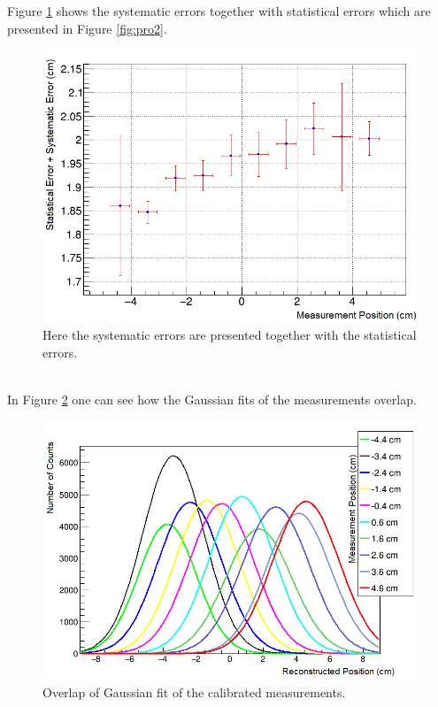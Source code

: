 \documentclass[a4paper]{article}\linespread{1.4}
\begin{document}
Figure \ref{fig:pro3} shows the systematic errors together with statistical errors which are presented in Figure \ref{fig:pro2}.
\begin{figure}[] \hspace*{-0cm} \includegraphics[width=120mm,scale=2.0]{figures/pro3.png} \caption{Here the systematic errors are presented together with the statistical errors.} \label{fig:pro3}\end{figure}
\\In Figure \ref{fig:pro4} one can see how the Gaussian fits of the measurements overlap.
\begin{figure}[] \hspace*{-0cm} \includegraphics[width=130mm,scale=2.0]{figures/pro4.png} \caption{Overlap of Gaussian fit of the calibrated measurements.}  \label{fig:pro4}\end{figure}
\end{document}
